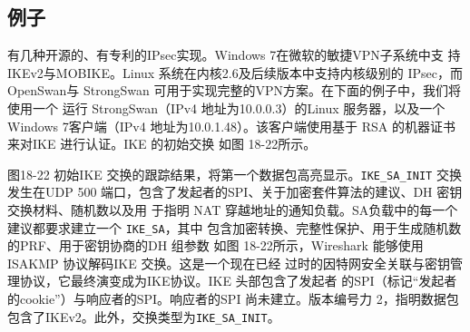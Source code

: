 \subsection{例子}
有几种开源的、有专利的IPsec实现。Windows 7在微软的敏捷VPN子系统中支
持IKEv2与MOBIKE。Linux 系统在内核2.6及后续版本中支持内核级别的 IPsec，而
OpenSwan与 StrongSwan 可用于实现完整的VPN方案。在下面的例子中，我们将使用一个
运行 StrongSwan（IPv4 地址为10.0.0.3）的Linux 服务器，以及一个 Windows 7客户端（IPv4
地址为10.0.1.48）。该客户端使用基于 RSA 的机器证书来对IKE 进行认证。IKE 的初始交换
如图 18-22所示。

图18-22
初始IKE 交换的跟踪结果，将第一个数据包高亮显示。\verb|IKE_SA_INIT| 交换发生在UDP 500
端口，包含了发起者的SPI、关于加密套件算法的建议、DH 密钥交换材料、随机数以及用
于指明 NAT 穿越地址的通知负载。SA负载中的每一个建议都要求建立一个 \verb|IKE_SA|，其中
包含加密转换、完整性保护、用于生成随机数的PRF、用于密钥协商的DH 组参数
如图 18-22所示，Wireshark 能够使用ISAKMP 协议解码IKE 交换。这是一个现在已经
过时的因特网安全关联与密钥管理协议，它最终演变成为IKE协议。IKE 头部包含了发起者
的SPI（标记“发起者的cookie”）与响应者的SPI。响应者的SPI 尚未建立。版本编号力
2，指明数据包包含了IKEv2。此外，交换类型为\verb|IKE_SA_INIT|。


